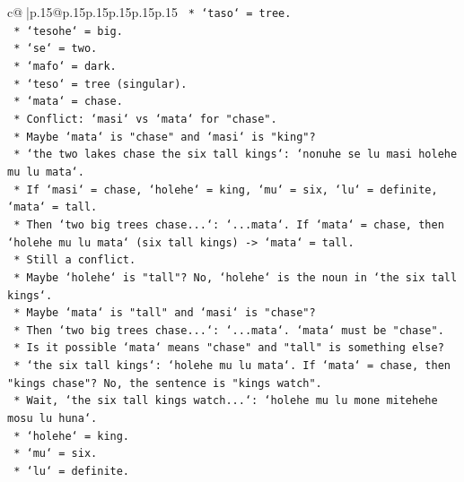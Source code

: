 \documentclass{article}
\begin{document}
{\begin{supertabular}{c@{$\;$}|p{.15\linewidth}@{}p{.15\linewidth}p{.15\linewidth}p{.15\linewidth}p{.15\linewidth}p{.15\linewidth}}
{{{\texttt{                    *   `taso` = tree.} \\
\texttt{                    *   `tesohe` = big.} \\
\texttt{                    *   `se` = two.} \\
\texttt{                    *   `mafo` = dark.} \\
\texttt{                    *   `teso` = tree (singular).} \\
\texttt{                    *   `mata` = chase.} \\
\texttt{                    *   Conflict: `masi` vs `mata` for "chase".} \\
\texttt{                    *   Maybe `mata` is "chase" and `masi` is "king"?} \\
\texttt{                        *   `the two lakes chase the six tall kings`: `nonuhe se lu masi holehe mu lu mata`.} \\
\texttt{                        *   If `masi` = chase, `holehe` = king, `mu` = six, `lu` = definite, `mata` = tall.} \\
\texttt{                        *   Then `two big trees chase...`: `...mata`. If `mata` = chase, then `holehe mu lu mata` (six tall kings) {-}> `mata` = tall.} \\
\texttt{                        *   Still a conflict.} \\
\texttt{                    *   Maybe `holehe` is "tall"? No, `holehe` is the noun in `the six tall kings`.} \\
\texttt{                    *   Maybe `mata` is "tall" and `masi` is "chase"?} \\
\texttt{                        *   Then `two big trees chase...`: `...mata`. `mata` must be "chase".} \\
\texttt{                        *   Is it possible `mata` means "chase" and "tall" is something else?} \\
\texttt{                        *   `the six tall kings`: `holehe mu lu mata`. If `mata` = chase, then "kings chase"? No, the sentence is "kings watch".} \\
\texttt{                        *   Wait, `the six tall kings watch...`: `holehe mu lu mone mitehehe mosu lu huna`.} \\
\texttt{                            *   `holehe` = king.} \\
\texttt{                            *   `mu` = six.} \\
\texttt{                            *   `lu` = definite.} \\
}}}
\end{supertabular}}
\end{document}
